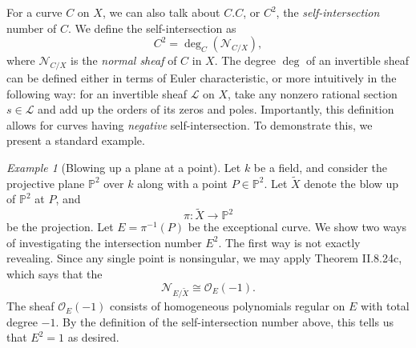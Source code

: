 \documentclass[12pt,twoside]{reedthesis}
\theoremstyle{plain}
\theoremstyle{definition}
\theoremstyle{remark}
\newtheorem{example}{Example}[section]
\newcommand{\Proj}{\mathbb{P}}
\newcommand{\calO}{\mathcal{O}}
\newcommand{\calL}{\mathcal{L}}
\begin{document}
For a curve $C$ on $X$, we can also talk about $C.C$, or $C^2$, the \emph{self-intersection} number of $C$. We define the self-intersection as \[C^2=\deg_C(\mathscr{N}_{C/X}),\] where $\mathscr{N}_{C/X}$ is the \emph{normal sheaf} of $C$ in $X$. The degree $\deg$ of an invertible sheaf can be defined either in terms of Euler characteristic, or more intuitively in the following way: for an invertible sheaf $\calL$ on $X$, take any nonzero rational section $s\in\calL$ and add up the orders of its zeros and poles. Importantly, this definition allows for curves having \emph{negative} self-intersection. To demonstrate this, we present a standard example.

\begin{example}[Blowing up a plane at a point]
Let $k$ be a field, and consider the projective plane $\Proj^2$ over $k$ along with a point $P\in\Proj^2$. Let $\widetilde{X}$ denote the blow up of $\Proj^2$ at $P$, and 
\[\pi:\widetilde{X}\to\Proj^2\] 
be the projection. Let $E=\pi^{-1}(P)$ be the exceptional curve. We show two ways of investigating the intersection number $E^2$. The first way is not exactly revealing. Since any single point is nonsingular, we may apply \cite{hartshorne} Theorem II.8.24c, which says that the 
\[\mathscr{N}_{E/\widetilde{X}} \cong\calO_{E}(-1).\] The sheaf $\calO_E(-1)$ consists of homogeneous polynomials regular on $E$ with total degree $-1$. By the definition of the self-intersection number above, this tells us that $E^2=1$ as desired.


\end{example}
\end{document}
